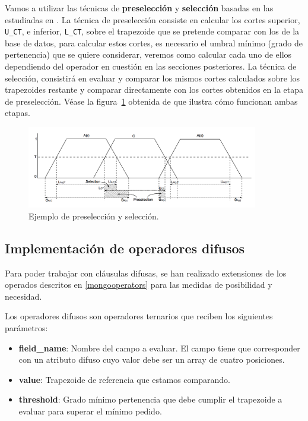 Vamos a utilizar las técnicas de \textbf{preselección} y \textbf{selección} basadas en las estudiadas en \cite{indexingstrategies}. La técnica de preselección consiste en calcular los cortes superior, \texttt{U\_CT}, e inferior, \texttt{L\_CT}, sobre el trapezoide que se pretende comparar con los de la base de datos, para calcular estos cortes, es necesario el umbral mínimo (grado de pertenencia) que se quiere considerar, veremos como calcular cada uno de ellos dependiendo del operador en cuestión en las secciones posteriores. La técnica de selección, consistirá en evaluar y comparar los mismos cortes calculados sobre los trapezoides restante y comparar directamente con los cortes obtenidos en la etapa de preselección. Véase la figura~\ref{fig:preselection} obtenida de \cite{indexingstrategies} que ilustra cómo funcionan ambas etapas.

\begin{figure}[h]
  \centering
  \includegraphics[width=0.9\textwidth]{gfx/preselection.png}
  \caption{\label{fig:preselection}Ejemplo de preselección y selección.}
\end{figure}

\subsection{Implementación de operadores difusos}

Para poder trabajar con cláusulas difusas, se han realizado extensiones de los operados descritos en \ref{mongooperators} para las medidas de posibilidad y necesidad.

Los operadores difusos son operadores ternarios que reciben los siguientes parámetros:

\begin{itemize}
    \item \textbf{field\_name}: Nombre del campo a evaluar. El campo tiene que corresponder con un atributo difuso cuyo valor debe ser un array de cuatro posiciones.
    \item \textbf{value}: Trapezoide de referencia que estamos comparando.
    \item \textbf{threshold}: Grado mínimo pertenencia que debe cumplir el trapezoide a evaluar para superar el mínimo pedido.
\end{itemize}

